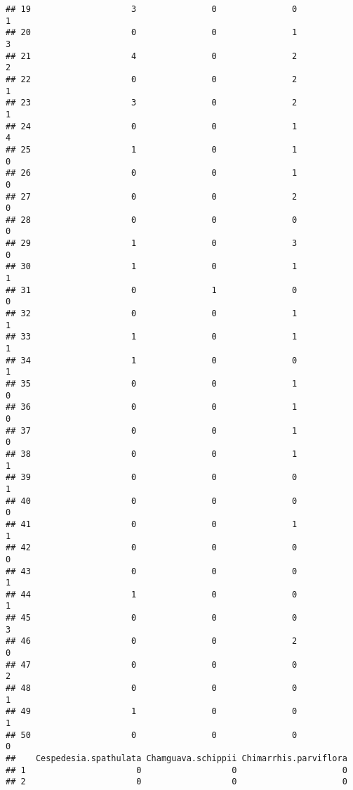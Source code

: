 \documentclass[
]{article}
\begin{document}
\begin{verbatim}
## 19                    3               0               0               1
## 20                    0               0               1               3
## 21                    4               0               2               2
## 22                    0               0               2               1
## 23                    3               0               2               1
## 24                    0               0               1               4
## 25                    1               0               1               0
## 26                    0               0               1               0
## 27                    0               0               2               0
## 28                    0               0               0               0
## 29                    1               0               3               0
## 30                    1               0               1               1
## 31                    0               1               0               0
## 32                    0               0               1               1
## 33                    1               0               1               1
## 34                    1               0               0               1
## 35                    0               0               1               0
## 36                    0               0               1               0
## 37                    0               0               1               0
## 38                    0               0               1               1
## 39                    0               0               0               1
## 40                    0               0               0               0
## 41                    0               0               1               1
## 42                    0               0               0               0
## 43                    0               0               0               1
## 44                    1               0               0               1
## 45                    0               0               0               3
## 46                    0               0               2               0
## 47                    0               0               0               2
## 48                    0               0               0               1
## 49                    1               0               0               1
## 50                    0               0               0               0
##    Cespedesia.spathulata Chamguava.schippii Chimarrhis.parviflora
## 1                      0                  0                     0
## 2                      0                  0                     0

\end{verbatim}
\end{document}
